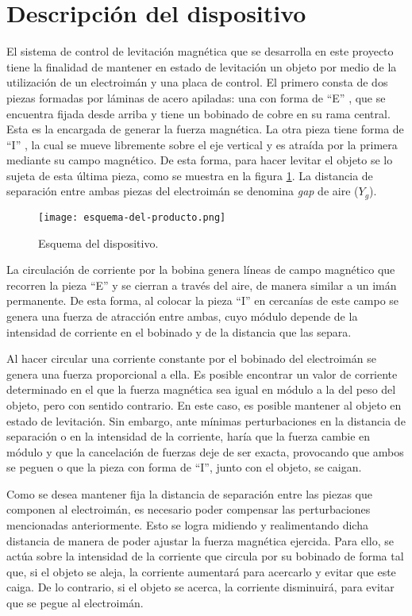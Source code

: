 \section{Descripción del dispositivo}
El sistema de control de levitación magnética que se desarrolla en este proyecto tiene la finalidad de mantener en estado de levitación un objeto por medio de la utilización de un electroimán y una placa de control. El primero consta de dos piezas formadas por láminas de acero apiladas: una con forma de “E” , que se encuentra fijada desde arriba y tiene un bobinado de cobre en su rama central. Esta es la encargada de generar la fuerza magnética. La otra pieza tiene forma de “I” , la cual se mueve libremente sobre el eje vertical y es atraída por la primera mediante su campo magnético. De esta forma, para hacer levitar el objeto se lo sujeta de esta última pieza, como se muestra en la figura \ref{fig:img_Esquema-del-producto}. La distancia de separación entre ambas piezas del electroimán se denomina  \textsl{gap} de aire ($Y_{g}$).

\begin{figure}[H]
	\centering
	\texttt{[image: esquema-del-producto.png]}
	\caption{Esquema del dispositivo.}
	\label{fig:img_Esquema-del-producto}
\end{figure}

La circulación de corriente por la bobina genera líneas de campo magnético que recorren la pieza “E” y se cierran a través del aire, de manera similar a un imán permanente. De esta forma, al colocar la pieza “I” en cercanías de este campo se genera una fuerza de atracción entre ambas, cuyo módulo depende de la intensidad de corriente en el bobinado y de la distancia que las separa.

Al hacer circular una corriente constante por el bobinado del electroimán se genera una fuerza proporcional a ella. Es posible encontrar un valor de corriente determinado en el que la fuerza magnética sea igual en módulo a la del peso del objeto, pero con sentido contrario. En este caso, es posible mantener al objeto en estado de levitación. Sin embargo, ante mínimas perturbaciones en la distancia de separación o en la intensidad de la corriente, haría que la fuerza cambie en módulo y que la cancelación de fuerzas deje de ser exacta, provocando que ambos se peguen o que la pieza con forma de “I”, junto con el objeto, se caigan. 

Como se desea mantener fija la distancia de separación entre las piezas que componen al electroimán, es necesario poder compensar las perturbaciones mencionadas anteriormente.   Esto se logra midiendo y realimentando dicha distancia de manera de poder ajustar la fuerza magnética ejercida. Para ello, se actúa sobre la intensidad de la corriente que circula por su bobinado de forma tal que, si el objeto se aleja, la corriente aumentará para acercarlo y evitar que este caiga. De lo contrario, si el objeto se acerca, la corriente disminuirá, para evitar que se pegue al electroimán. 

